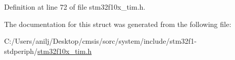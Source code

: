 Definition at line 72 of file stm32f10x\+\_\+tim.\+h.



The documentation for this struct was generated from the following file\+:\begin{DoxyCompactItemize}
\item 
C\+:/\+Users/anilj/\+Desktop/cmsis/sorc/system/include/stm32f1-\/stdperiph/\hyperlink{stm32f10x__tim_8h}{stm32f10x\+\_\+tim.\+h}\end{DoxyCompactItemize}
